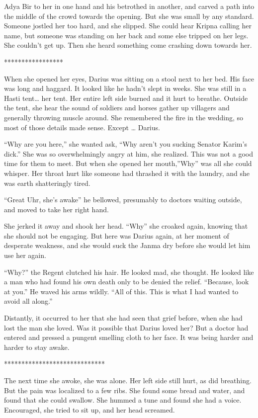 \documentclass{article}
\begin{document}
	Adya Bir to her in one hand and his betrothed in another, and carved a path into the middle of the crowd towards the opening. But she was small by any standard. Someone jostled her too hard, and she slipped. She could hear Kripna calling her name, but someone was standing on her back and some else tripped on her legs. She couldn’t get up. Then she heard something come crashing down towards her.
	
	*****************
	
	When she opened her eyes, Darius was sitting on a stool next to her bed. His face was long and haggard. It looked like he hadn’t slept in weeks. She was still in a Hasti tent… her tent. Her entire left side burned and it hurt to breathe. Outside the tent, she hear the sound of soldiers and horses gather up villagers and generally throwing muscle around. She remembered the fire in the wedding, so most of those details made sense. Except … Darius.
	
	“Why are you here,” she wanted ask, “Why aren’t you sucking Senator Karim’s dick.” She was so overwhelmingly angry at him, she realized. This was not a good time for them to meet. But when she opened her mouth,”Why” was all she could whisper. Her throat hurt like someone had thrashed it with the laundry, and she was earth shatteringly tired.
	
	“Great Uhr, she’s awake” he bellowed, presumably to doctors waiting outside, and moved to take her right hand. 
	
	She jerked it away and shook her head. “Why” she croaked again, knowing that she should not be engaging. But here was Darius again, at her moment of desperate weakness, and she would suck the Janma dry before she would let him use her again.
	
	“Why?” the Regent clutched his hair. He looked mad, she thought. He looked like a man who had found his own death only to be denied the relief. “Because, look at you.” He waved his arms wildly. “All of this. This is what I had wanted to avoid all along.”
	
	Distantly, it occurred to her that she had seen that grief before, when she had lost the man she loved. Was it possible that Darius loved her? But a doctor had entered and pressed a pungent smelling cloth to her face. It was being harder and harder to stay awake.
	
	*****************************
	
	The next time she awoke, she was alone. Her left side still hurt, as did breathing. But the pain was localized to a few ribs. She found some bread and water, and found that she could swallow. She hummed a tune and found she had a voice. Encouraged, she tried to sit up, and her head screamed.
	
\end{document}
